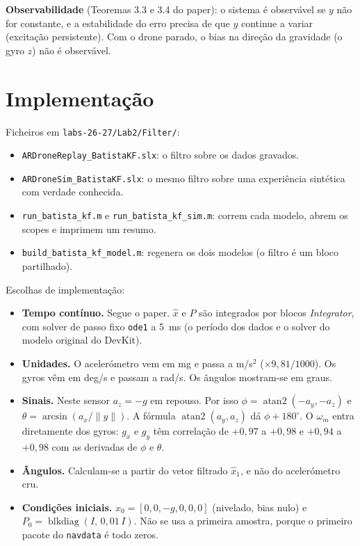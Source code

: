 \documentclass[10pt,a4paper]{article}
\newcommand{\code}[1]{\texttt{#1}}
\newcommand{\wm}{\omega_m}
\begin{document}
\textbf{Observabilidade} (Teoremas 3.3 e 3.4 do paper): o sistema \'e observ\'avel se $y$ n\~ao for constante, e a estabilidade do erro precisa de que $y$ continue a variar (excita\c{c}\~ao persistente).
Com o drone parado, o bias na dire\c{c}\~ao da gravidade (o gyro $z$) n\~ao \'e observ\'avel.

\section{Implementa\c{c}\~ao}

Ficheiros em \code{labs-26-27/Lab2/Filter/}:
\begin{itemize}
  \item \code{ARDroneReplay\_BatistaKF.slx}: o filtro sobre os dados gravados.
  \item \code{ARDroneSim\_BatistaKF.slx}: o mesmo filtro sobre uma experi\^encia sint\'etica com verdade conhecida.
  \item \code{run\_batista\_kf.m} e \code{run\_batista\_kf\_sim.m}: correm cada modelo, abrem os scopes e imprimem um resumo.
  \item \code{build\_batista\_kf\_model.m}: regenera os dois modelos (o filtro \'e um bloco partilhado).
\end{itemize}

Escolhas de implementa\c{c}\~ao:
\begin{itemize}
  \item \textbf{Tempo cont\'inuo.} Segue o paper. $\hat x$ e $P$ s\~ao integrados por blocos \emph{Integrator}, com solver de passo fixo \code{ode1} a 5~ms (o per\'iodo dos dados e o solver do modelo original do DevKit).
  \item \textbf{Unidades.} O aceler\'ometro vem em mg e passa a m/s$^2$ ($\times 9{,}81/1000$). Os gyros v\^em em deg/s e passam a rad/s. Os \^angulos mostram-se em graus.
  \item \textbf{Sinais.} Neste sensor $a_z = -g$ em repouso. Por isso $\phi = \operatorname{atan2}(-a_y,-a_z)$ e $\theta = \arcsin(a_x/\lVert y\rVert)$. A f\'ormula $\operatorname{atan2}(a_y,a_z)$ d\'a $\phi + 180^\circ$. O $\wm$ entra diretamente dos gyros: $g_x$ e $g_y$ t\^em correla\c{c}\~ao de $+0{,}97$ a $+0{,}98$ e $+0{,}94$ a $+0{,}98$ com as derivadas de $\phi$ e $\theta$.
  \item \textbf{\^Angulos.} Calculam-se a partir do vetor filtrado $\hat x_1$, e n\~ao do aceler\'ometro cru.
  \item \textbf{Condi\c{c}\~oes iniciais.} $x_0 = [0,0,-g,0,0,0]$ (nivelado, bias nulo) e $P_0 = \operatorname{blkdiag}(I,\,0{,}01\,I)$. N\~ao se usa a primeira amostra, porque o primeiro pacote do \code{navdata} \'e todo zeros.
\end{itemize}
\end{document}
